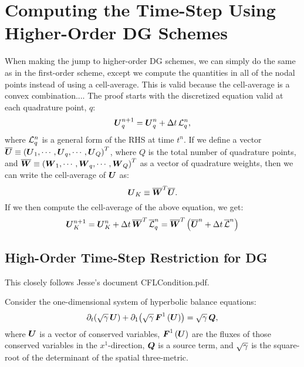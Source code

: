 \section{Computing the Time-Step Using Higher-Order DG Schemes}

When making the jump to higher-order DG schemes, we can simply do the same as in the first-order scheme, except we compute the quantities in all of the nodal points instead of using a cell-average. This is valid because the cell-average is a convex combination.... The proof starts with the discretized equation valid at each quadrature point, $q$:
\begin{equation}
    \bU_{q}^{n+1}=\bU_{q}^{n}+\Delta t\,\cL_{q}^{n},
\end{equation}
where $\cL_{q}^{n}$ is a general form of the RHS at time $t^{n}$. If we define a vector $\ol{\bU}\equiv\left(\bU_{1},\cdots,\bU_{q},\cdots,\bU_{Q}\right)^T$, where $Q$ is the total number of quadrature points, and $\ol{\bW}\equiv\left(\bW_{1},\cdots,\bW_{q},\cdots,\bW_{Q}\right)^T$ as a vector of quadrature weights, then we can write the cell-average of $\bU$ as:
\begin{equation}
    \bU_{K}\equiv\ol{\bW}^T\ol{\bU}.
\end{equation}
If we then compute the cell-average of the above equation, we get:
\begin{equation}
    \bU_{K}^{n+1}=\bU_{K}^{n}+\Delta t\,\ol{\bW}^{T}\,\ol{\cL}_{q}^{n}=\ol{\bW}^{T}\left(\ol{\bU}^{n}+\Delta t\,\ol{\cL}^{n}\right)
\end{equation}

\subsection{High-Order Time-Step Restriction for DG}

 This closely follows Jesse's document CFLCondition.pdf.

Consider the one-dimensional system of hyperbolic balance equations:
\begin{equation}\label{Eq:HypBalEqns}
    \pd{\left(\sqrtgm\,\bU\right)}{t}+\pd{\left(\sqrtgm\,\bF^{1}\left(\bU\right)\right)}{1}=\sqrtgm\,\bQ,
\end{equation}
where $\bU$ is a vector of conserved variables, $\bF^{1}\left(\bU\right)$ are the fluxes of those conserved variables in the $x^{1}$-direction, $\bQ$ is a source term, and $\sqrtgm$ is the square-root of the determinant of the spatial three-metric.

